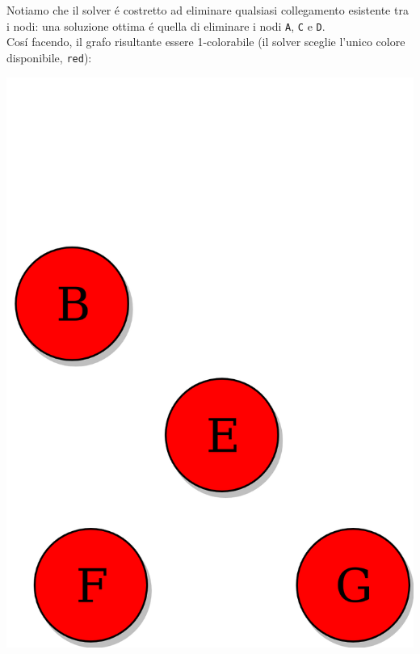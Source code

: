 \documentclass{article}
\begin{document}
\pagebreak

Notiamo che il solver \'e costretto ad eliminare qualsiasi collegamento esistente tra i nodi: una soluzione ottima \'e quella di eliminare i nodi \texttt{A}, \texttt{C} e \texttt{D}.\\
Cos\'i facendo, il grafo risultante essere 1-colorabile (il solver sceglie l'unico colore disponibile, \texttt{red}):

\begin{center}
\includegraphics[scale=0.15]{tree_coloured.png}
\end{center}
\end{document}
